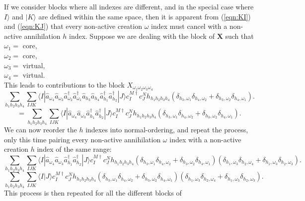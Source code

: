 \documentclass[12pt]{article}
\begin{document}
\noindent If we consider blocks where all indexes are different, and in the
special case where $I\rangle$ and $|K\rangle$ are defined within the same
space, then it is apparent from (\ref{eqn:KI}) and  (\ref{eqn:KJ}) that every
non-active creation $\omega$ index must cancel with a non-active annihilation
$h$ index. Suppose we are dealing with the block of $\mathbf{X}$ such that \\
$\omega_{1} = $ core,\\  
$\omega_{2} = $ core,   \\
$\omega_{3} = $ virtual, \\
$\omega_{4} = $ virtual.\\ 
\noindent  This leads to contributions to the block $X_{\omega_{1}\omega_{2}\omega_{3}\omega_{4}}$ 
\begin{equation*}
\sum_{h_{1}h_{2}h_{3}h_{4}} 
\sum_{IJK}
\langle I |
\hat{a}_{\omega_{4}} \hat{a}_{\omega_{3}}\hat{a}^{\dagger}_{\omega_{2}}\hat{a}^{\dagger}_{\omega_{1}}
\hat{a}_{h_{3}}\hat{a}_{h_{4}}\hat{a}^{\dagger}_{h_{1}} \hat{a}^{\dagger}_{h_{2}}| J \rangle  
c^{M \dagger}_{I}c^{N}_{J} h_{h_{1}h_{2}h_{3}h_{4}}( \delta_{h_{3},\omega_{1}}\delta_{h_{4},\omega_{2}} +  \delta_{h_{3},\omega_{2}}\delta_{h_{4},\omega_{1}} ).
\end{equation*}
\begin{equation}
=\sum_{h_{1}h_{2}h_{3}h_{4}} 
\sum_{IJK}
\langle I |
\hat{a}_{\omega_{4}} \hat{a}_{\omega_{3}}\hat{a}^{\dagger}_{h_{1}} \hat{a}^{\dagger}_{h_{2}}| J \rangle  
c^{M \dagger}_{I}c^{N}_{J} h_{h_{1}h_{2}h_{3}h_{4}}( \delta_{h_{3},\omega_{1}}\delta_{h_{4},\omega_{2}} +  \delta_{h_{3},\omega_{2}}\delta_{h_{4},\omega_{1}} ).
\label{eqn:XRIHmatch}
\end{equation}
\noindent We can now reorder the $h$ indexes into normal-ordering, and repeat
the process, only this time pairing every non-active annihilation $\omega$
index with a non-active creation $h$ index of the same range:
\begin{equation*}
\sum_{h_{1}h_{2}h_{3}h_{4}} 
\sum_{IJK}
\langle I |
\hat{a}_{\omega_{4}} \hat{a}_{\omega_{3}}\hat{a}^{\dagger}_{h_{1}} \hat{a}^{\dagger}_{h_{2}}| J \rangle  
c^{M \dagger}_{I}c^{N}_{J} h_{h_{1}h_{2}h_{3}h_{4}}
( \delta_{h_{3},\omega_{1}}\delta_{h_{4},\omega_{2}} +  \delta_{h_{3},\omega_{2}}\delta_{h_{4},\omega_{1}} )
( \delta_{h_{1},\omega_{3}}\delta_{h_{2},\omega_{4}} +  \delta_{h_{1},\omega_{3}}\delta_{h_{2},\omega_{3}} ).
\end{equation*}
\begin{equation}
\sum_{h_{1}h_{2}h_{3}h_{4}} 
\sum_{IJK}
\langle I|J\rangle c^{M \dagger}_{I}
c^{N}_{J} h_{h_{1}h_{2}h_{3}h_{4}}
( \delta_{h_{3},\omega_{1}}\delta_{h_{4},\omega_{2}} +  \delta_{h_{3},\omega_{2}}\delta_{h_{4},\omega_{1}} )
( \delta_{h_{1},\omega_{3}}\delta_{h_{2},\omega_{4}} +  \delta_{h_{1},\omega_{3}}\delta_{h_{2},\omega_{3}} ).
\label{eqn:XRIHmatch2}
\end{equation} This process is then repeated for all the different blocks  of
\end{document}
